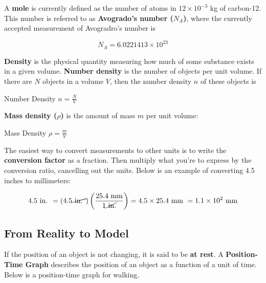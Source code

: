         \noindent A \textbf{mole} is currently defined as the number of atoms in $12\times 10^{-3}$ kg of carbon-12. This number is referred to as \textbf{Avogrado's number ($N_A$)}, where the currently accepted
        measurement of Avogradro's number is

        \begin{equation*}
            N_A = 6.0221413 \times 10^{23}
        \end{equation*}

        \noindent \textbf{Density} is the physical quantity measuring how much of some substance exists in a given volume. \textbf{Number density} is the number of objects per unit volume. If there are $N$ objects in a
        volume $V$, then the number density $n$ of these objects is

        \begin{tbhtheorem}{Number Density}
            $n = \frac{N}{V}$
        \end{tbhtheorem}

        \noindent \textbf{Mass density ($\rho$)} is the amount of mass $m$ per unit volume:

        \begin{tbhtheorem}{Mass Density}
            $\rho = \frac{m}{V}$
        \end{tbhtheorem}

        \noindent The easiest way to convert measurements to other units is to write the \textbf{conversion factor} as a fraction. Then multiply what you're to express by the conversion ratio, cancelling out the units.
        Below is an example of converting 4.5 inches to millimeters:

        \begin{equation*}
            4.5 \text{ in. } = (4.5 \cancel{\text{ in. }})\left(\frac{25.4\text{ mm}}{1 \cancel{\text{ in.}}}\right) = 4.5 \times 25.4 \text{ mm } = 1.1 \times 10^2 \text{ mm}
        \end{equation*}


    \subsection{From Reality to Model}

        If the position of an object is not changing, it is said to be \textbf{at rest}. A \textbf{Position-Time Graph} describes the position of an object as a function of a unit of time. Below is a position-time graph
        for walking.

